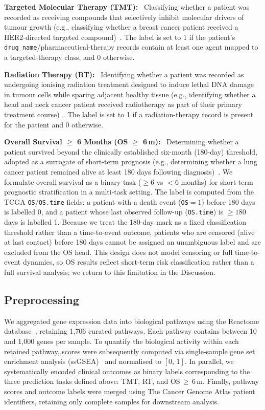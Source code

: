 \documentclass[sigconf]{acmart}
\begin{document}
\medskip
\noindent\textbf{Targeted Molecular Therapy (TMT):}\ %
Classifying whether a patient was recorded as receiving compounds that
selectively inhibit molecular drivers of tumour growth (e.g.,
classifying whether a breast cancer patient received a HER2-directed
targeted compound)~\cite{Min2022}. The label is set to 1 if the patient's
\texttt{drug\_name}/pharmaceutical-therapy records contain at least one
agent mapped to a targeted-therapy class, and 0 otherwise.

\medskip
\noindent\textbf{Radiation Therapy (RT):}\ %
Identifying whether a patient was recorded as undergoing ionising radiation
treatment designed to induce lethal DNA damage in tumour cells while sparing
adjacent healthy tissue (e.g., identifying whether a head and neck cancer
patient received radiotherapy as part of their primary treatment
course)~\cite{Baskar2012}. The label is set to 1 if a radiation-therapy
record is present for the patient and 0 otherwise.

\medskip
\noindent\textbf{Overall Survival $\geq$ 6 Months (OS $\geq$ 6\,m):}\ %
Determining whether a patient survived beyond the clinically established
six-month (180-day) threshold, adopted as a surrogate of short-term prognosis
(e.g., determining whether a lung cancer patient remained alive at least
180 days following diagnosis)~\cite{SideyGibbons2022, Parikh2019}.
We formulate overall survival as a binary task ($\geq 6$ vs $<6$ months)
for short-term prognostic stratification in a multi-task setting. The label
is computed from the TCGA \texttt{OS}/\texttt{OS.time} fields: a patient with
a death event (\texttt{OS}$=1$) before 180 days is labelled 0, and a patient
whose last observed follow-up (\texttt{OS.time}) is $\geq 180$ days is
labelled 1. Because we treat the 180-day mark as a fixed classification
threshold rather than a time-to-event outcome, patients who are censored
(alive at last contact) before 180 days cannot be assigned an unambiguous
label and are excluded from the OS head. This design does not model
censoring or full time-to-event dynamics, so OS results reflect short-term
risk classification rather than a full survival analysis; we return to this
limitation in the Discussion.

\subsection{Preprocessing}

We aggregated gene expression data into biological pathways using the
Reactome database~\cite{gillespie2022reactome}, retaining 1{,}706 curated pathways.
Each pathway contains between 10 and 1{,}000 genes per sample. To quantify
the biological activity within each retained pathway, scores were
subsequently computed via single-sample gene set enrichment analysis
(ssGSEA)~\cite{barbie2009ssgsea, subramanian2005gsea} and normalised to $[0,\,1]$. In parallel, we
systematically encoded clinical outcomes as binary labels corresponding to
the three prediction tasks defined above: TMT, RT, and OS\,$\geq$\,6\,m.
Finally, pathway scores and outcome labels were merged using The Cancer
Genome Atlas patient identifiers, retaining only complete samples for
downstream analysis.
\end{document}
